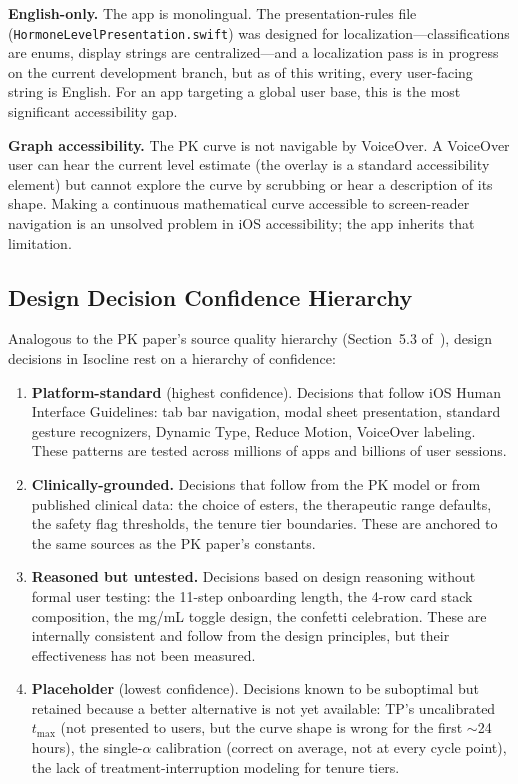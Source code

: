 \documentclass[11pt,a4paper]{article}
\newcommand{\code}[1]{\texttt{\small #1}}
\begin{document}
\textbf{English-only.} The app is monolingual. The presentation-rules
file (\code{HormoneLevelPresentation.swift}) was designed for
localization---classifications are enums, display strings are
centralized---and a localization pass is in progress on the current
development branch, but as of this writing, every user-facing string is
English. For an app targeting a global user base, this is the most
significant accessibility gap.

\textbf{Graph accessibility.} The PK curve is not navigable by VoiceOver.
A VoiceOver user can hear the current level estimate (the overlay is a
standard accessibility element) but cannot explore the curve by scrubbing
or hear a description of its shape. Making a continuous mathematical
curve accessible to screen-reader navigation is an unsolved problem in
iOS accessibility; the app inherits that limitation.

\subsection{Design Decision Confidence Hierarchy}
\label{sec:confidence}

Analogous to the PK paper's source quality hierarchy (Section~5.3
of~\cite{xtpk}), design decisions in Isocline rest on a hierarchy of
confidence:

\begin{enumerate}[nosep,leftmargin=1.4em]
\item \textbf{Platform-standard} (highest confidence). Decisions that
  follow iOS Human Interface Guidelines: tab bar navigation, modal sheet
  presentation, standard gesture recognizers, Dynamic Type, Reduce
  Motion, VoiceOver labeling. These patterns are tested across millions
  of apps and billions of user sessions.
\item \textbf{Clinically-grounded.} Decisions that follow from the PK
  model or from published clinical data: the choice of esters, the
  therapeutic range defaults, the safety flag thresholds, the tenure tier
  boundaries. These are anchored to the same sources as the PK paper's
  constants.
\item \textbf{Reasoned but untested.} Decisions based on design reasoning
  without formal user testing: the 11-step onboarding length, the 4-row
  card stack composition, the mg/mL toggle design, the confetti
  celebration. These are internally consistent and follow from the design
  principles, but their effectiveness has not been measured.
\item \textbf{Placeholder} (lowest confidence). Decisions known to be
  suboptimal but retained because a better alternative is not yet
  available: TP's uncalibrated $t_{\max}$ (not presented to users, but
  the curve shape is wrong for the first $\sim$24\,hours), the single-$\alpha$
  calibration (correct on average, not at every cycle point), the lack
  of treatment-interruption modeling for tenure tiers.
\end{enumerate}
\end{document}
